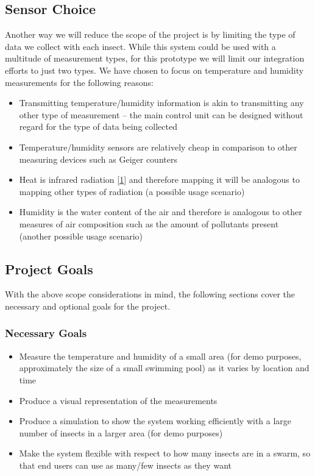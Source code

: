 \documentclass[11pt]{article}
\begin{document}
\subsection{Sensor Choice}
Another way we will reduce the scope of the project is by limiting the type of data we collect with each insect. While this system could be used with a multitude of measurement types, for this prototype we will limit our integration efforts to just two types. We have chosen to focus on temperature and humidity measurements for the following reasons:

\begin{itemize}
    \item Transmitting temperature/humidity information is akin to transmitting any other type of measurement -- the main control unit can be designed without regard for the type of data being collected
    \item Temperature/humidity sensors are relatively cheap in comparison to other measuring devices such as Geiger counters
    \item Heat is infrared radiation [\hyperref[sec:references]{1}] and therefore mapping it will be analogous to mapping other types of radiation (a possible usage scenario)
    \item Humidity is the water content of the air and therefore is analogous to other measures of air composition such as the amount of pollutants present (another possible usage scenario)
\end{itemize}

\subsection{Project Goals}
With the above scope considerations in mind, the following sections cover the necessary and optional goals for the project.
\subsubsection{Necessary Goals}
\begin{itemize}
    \item Measure the temperature and humidity of a small area (for demo purposes, approximately the size of a small swimming pool) as it varies by location and time
    \item Produce a visual representation of the measurements
    \item Produce a simulation to show the system working efficiently with a large number of insects in a larger area (for demo purposes) 
    \item Make the system flexible with respect to how many insects are in a swarm, so that end users can use as many/few insects as they want
\end{itemize}
\end{document}
